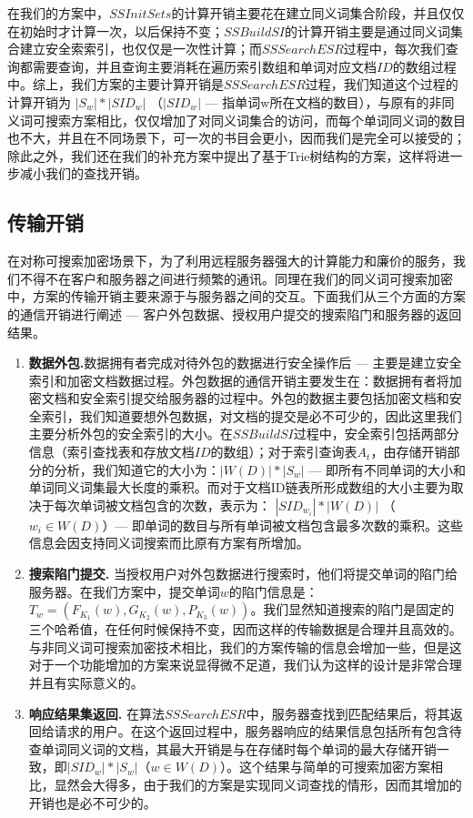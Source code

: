 在我们的方案中，$SSInitSets$的计算开销主要花在建立同义词集合阶段，并且仅仅在初始时才计算一次，以后保持不变；$SSBuildSI$的计算开销主要是通过同义词集合建立安全索索引，也仅仅是一次性计算；而$SSSearchESR$过程中，每次我们查询都需要查询，并且查询主要消耗在遍历索引数组和单词对应文档$ID$的数组过程中。综上，我们方案的主要计算开销是$SSSearchESR$过程，我们知道这个过程的计算开销为 $ |S_w| * |SID_w| $ （$|SID_w|$ --- 指单词w所在文档的数目），与原有的非同义词可搜索方案相比，仅仅增加了对同义词集合的访问，而每个单词同义词的数目也不大，并且在不同场景下，可一次的书目会更小，因而我们是完全可以接受的；除此之外，我们还在我们的补充方案中提出了基于Trie树结构的方案，这样将进一步减小我们的查找开销。



\subsection{传输开销}
\label{sec:synonym_capability_transmission}
在对称可搜索加密场景下，为了利用远程服务器强大的计算能力和廉价的服务，我们不得不在客户和服务器之间进行频繁的通讯。同理在我们的同义词可搜索加密中，方案的传输开销主要来源于与服务器之间的交互。下面我们从三个方面的方案的通信开销进行阐述 --- 客户外包数据、授权用户提交的搜索陷门和服务器的返回结果。

\begin{enumerate}
  \item
  \textbf{数据外包.}数据拥有者完成对待外包的数据进行安全操作后 --- 主要是建立安全索引和加密文档数据过程。外包数据的通信开销主要发生在：数据拥有者将加密文档和安全索引提交给服务器的过程中。外包的数据主要包括加密文档和安全索引，我们知道要想外包数据，对文档的提交是必不可少的，因此这里我们主要分析外包的安全索引的大小。在$SSBuildSI$过程中，安全索引包括两部分信息（索引查找表和存放文档$ID$的数组）；对于索引查询表$A_t$，由存储开销部分的分析，我们知道它的大小为：$ |W(D)| * |S_w| $ --- 即所有不同单词的大小和单词同义词集最大长度的乘积。而对于文档ID链表所形成数组的大小主要为取决于每次单词被文档包含的次数，表示为： $ |SID_{w_i}| * |W(D)| $ （$ w_i \in W(D) $）--- 即单词的数目与所有单词被文档包含最多次数的乘积。这些信息会因支持同义词搜索而比原有方案有所增加。


  \item
  \textbf{搜索陷门提交.} 当授权用户对外包数据进行搜索时，他们将提交单词的陷门给服务器。在我们方案中，提交单词$w$的陷门信息是：$ T_w = (F_{K_1}(w), G_{K_2}(w), P_{K_3}(w))$。我们显然知道搜索的陷门是固定的三个哈希值，在任何时候保持不变，因而这样的传输数据是合理并且高效的。与非同义词可搜索加密技术相比，我们的方案传输的信息会增加一些，但是这对于一个功能增加的方案来说显得微不足道，我们认为这样的设计是非常合理并且有实际意义的。


  \item
  \textbf{响应结果集返回.} 在算法$SSSearchESR$中，服务器查找到匹配结果后，将其返回给请求的用户。在这个返回过程中，服务器响应的结果信息包括所有包含待查单词同义词的文档，其最大开销是与在存储时每个单词的最大存储开销一致，即$ |SID_w| * |S_w|$（$w \in W(D)$）。这个结果与简单的可搜索加密方案相比，显然会大得多，由于我们的方案是实现同义词查找的情形，因而其增加的开销也是必不可少的。

\end{enumerate}

